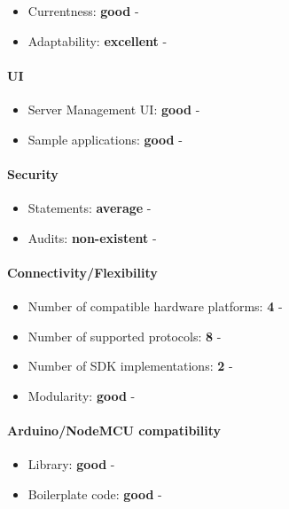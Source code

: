 \documentclass{article}
\begin{document}
\begin{itemize}
\item Currentness: \textbf{good} - 
\item Adaptability: \textbf{excellent} - 
\end{itemize}

\paragraph{UI}

\begin{itemize}
\item Server Management UI: \textbf{good} - 
\item Sample applications: \textbf{good} - 
\end{itemize}

\paragraph{Security} 

\begin{itemize}
\item Statements: \textbf{average} - 
\item Audits: \textbf{non-existent} - 
\end{itemize}

\paragraph{Connectivity/Flexibility}

\begin{itemize}
\item Number of compatible hardware platforms: \textbf{4} - 
\item Number of supported protocols: \textbf{8} - 
\item Number of SDK implementations: \textbf{2} - 
\item Modularity: \textbf{good} - 
\end{itemize}

\paragraph{Arduino/NodeMCU compatibility}

\begin{itemize}
\item Library: \textbf{good} - 
\item Boilerplate code: \textbf{good} - 
\end{itemize}
\end{document}
